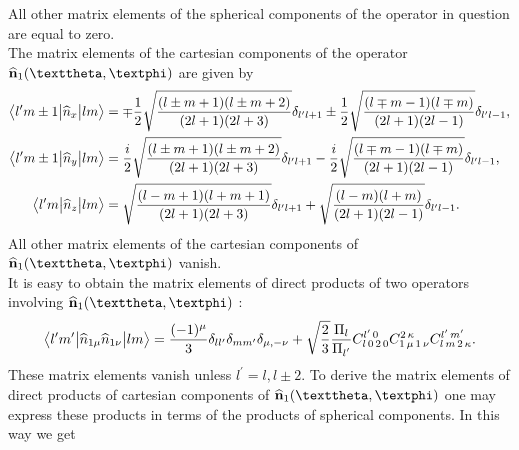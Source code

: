 All other matrix elements of the spherical components of the operator in question are equal to zero.\\
The matrix elements of the cartesian components of the operator \(\widehat{\vect{n}}_{1}(\vartheta, \varphi)\) are given by
\begin{align}
\bigl\langle  l^{\prime} m \pm 1 \big|  \widehat{n}_{x} \big| l m \bigr\rangle & =\mp \frac{1}{2} \sqrt{\frac{(l \pm m+1)(l \pm m+2)}{(2 l+1)(2 l+3)}} \delta_{l^{\prime} l+1} \pm \frac{1}{2} \sqrt{\frac{(l \mp m-1)(l \mp m)}{(2 l+1)(2 l-1)}} \delta_{l^{\prime} l-1},  \label{eq:13:2:14}\\
\bigl\langle  l^{\prime} m \pm 1 \big|  \widehat{n}_{y} \big| l m \bigr\rangle & =\frac{i}{2} \sqrt{\frac{(l \pm m+1)(l \pm m+2)}{(2 l+1)(2 l+3)}} \delta_{l^{\prime} l+1}-\frac{i}{2} \sqrt{\frac{(l \mp m-1)(l \mp m)}{(2 l+1)(2 l-1)}} \delta_{l^{\prime} l-1},  \label{eq:13:2:15}\\
\bigl\langle  l^{\prime} m \big|  \widehat{n}_{z} \big| l m \bigr\rangle & =\sqrt{\frac{(l-m+1)(l+m+1)}{(2 l+1)(2 l+3)}} \delta_{l^{\prime} l+1}+\sqrt{\frac{(l-m)(l+m)}{(2 l+1)(2 l-1)}} \delta_{l^{\prime} l-1}. \label{eq:13:2:16}
\end{align}
All other matrix elements of the cartesian components of \(\widehat{\vect{n}}_{1}(\vartheta, \varphi)\) vanish.\\
It is easy to obtain the matrix elements of direct products of two operators involving \(\widehat{\vect{n}}_{1}(\vartheta, \varphi)\) :
\begin{equation}
\braOket{ l^{\prime} m^{\prime}}{ \widehat{n}_{1 \mu} \widehat{n}_{1 \nu}}{l m}=\frac{(-1)^{\mu}}{3} \delta_{l l^{\prime}} \delta_{m m^{\prime}} \delta_{\mu,-\nu}+\sqrt{\frac{2}{3}} \frac{\Fact{l}}{\Fact{l^{\prime}}} 
\clebsch{l}{0}{2}{0}{l^{\prime}}{0} 
\clebsch{1}{\mu}{1}{\nu}{2}{\kappa} 
\clebsch{l}{m}{2}{\kappa}{l^{\prime}}{m^{\prime}}. \label{eq:13:2:17}
\end{equation}
These matrix elements vanish unless \(l^{\prime}=l, l \pm 2\). To derive the matrix elements of direct products of cartesian components of \(\widehat{\vect{n}}_{1}(\vartheta, \varphi)\) one may express these products in terms of the products of spherical components. In this way we get
